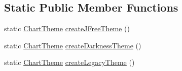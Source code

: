 \subsection*{Static Public Member Functions}
\begin{DoxyCompactItemize}
\item 
static \mbox{\hyperlink{interfaceorg_1_1jfree_1_1chart_1_1_chart_theme}{Chart\+Theme}} \mbox{\hyperlink{classorg_1_1jfree_1_1chart_1_1_standard_chart_theme_ae1f9cd15756ffd50d1dc606e099dc610}{create\+J\+Free\+Theme}} ()
\item 
static \mbox{\hyperlink{interfaceorg_1_1jfree_1_1chart_1_1_chart_theme}{Chart\+Theme}} \mbox{\hyperlink{classorg_1_1jfree_1_1chart_1_1_standard_chart_theme_ab6dc4ddda841c118c4cf282d6f78c8cf}{create\+Darkness\+Theme}} ()
\item 
static \mbox{\hyperlink{interfaceorg_1_1jfree_1_1chart_1_1_chart_theme}{Chart\+Theme}} \mbox{\hyperlink{classorg_1_1jfree_1_1chart_1_1_standard_chart_theme_ae30095b6cff95ab0a49cc9ee6adf3771}{create\+Legacy\+Theme}} ()
\end{DoxyCompactItemize}

